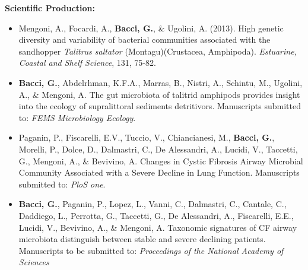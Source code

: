 \documentclass[10pt]{beamer}
\begin{document}
\begin{frame}
	\textbf{\Large{Scientific Production:}}
	\footnotesize{%
	\begin{itemize}
		\item Mengoni, A., Focardi, A., \textbf{Bacci, G.}, \& Ugolini, A. (2013). High genetic diversity and variability of bacterial communities associated with the sandhopper \textit{Talitrus saltator} (Montagu)(Crustacea, Amphipoda). \textit{Estuarine, Coastal and Shelf Science}, 131, 75-82.
		\item \textbf{Bacci, G.}, Abdelrhman, K.F.A., Marras, B., Nistri, A., Schintu, M., Ugolini, A., \& Mengoni, A. The gut microbiota of talitrid amphipods provides insight into the ecology of supralittoral sediments detritivors. Manuscripts submitted to: \textit{FEMS Microbiology Ecology}.
		\item Paganin, P., Fiscarelli, E.V., Tuccio, V., Chiancianesi, M., \textbf{Bacci, G.}, Morelli, P., Dolce, D., Dalmastri, C., De Alessandri, A., Lucidi, V., Taccetti, G., Mengoni, A., \& Bevivino, A. Changes in Cystic Fibrosis Airway Microbial Community Associated with a Severe Decline in Lung Function. Manuscripts submitted to: \textit{PloS one}.
		\item \textbf{Bacci, G.}, Paganin, P., Lopez, L., Vanni, C., Dalmastri, C., Cantale, C., Daddiego, L., Perrotta, G., Taccetti, G., De Alessandri, A., Fiscarelli, E.E., Lucidi, V., Bevivino, A., \& Mengoni, A. Taxonomic signatures of CF airway microbiota distinguish between stable and severe declining patients. Manuscripts to be  submitted to: \textit{Proceedings of the National Academy of Sciences}
	\end{itemize}
	}
\end{frame}	
	
\end{document}
